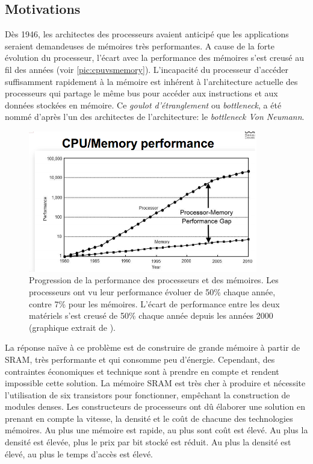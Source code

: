\subsection{Motivations}


Dès 1946, les architectes des processeurs avaient anticipé que les applications seraient demandeuses de mémoires très performantes. A cause de la forte évolution du processeur, l'écart avec la performance des mémoires s'est creusé au fil des années (voir \autoref{pic:cpuvsmemory}). L'incapacité du processeur d'accéder suffisamment rapidement à la mémoire est inhérent à l'architecture actuelle des processeurs qui partage le même bus pour accéder aux instructions et aux données stockées en mémoire. Ce \textit{goulot d'étranglement} ou \textit{bottleneck}, a été nommé d'après l'un des architectes de l'architecture: le \textit{bottleneck Von Neumann}.


\begin{figure}
    \center
    \includegraphics[width=10cm]{images/cpu_vs_memory.png}
    \caption{\label{pic:cpuvsmemory} Progression de la performance des processeurs et des mémoires. Les processeurs ont vu leur performance évoluer de 50\% chaque année, contre 7\% pour les mémoires. L'écart de performance entre les deux matériels s'est creusé de 50\%  chaque année depuis les années 2000 (graphique extrait de \cite{AliSalehi2012}).}
\end{figure}

La réponse naïve à ce problème est de construire de grande mémoire à partir de SRAM, très performante et qui consomme peu d'énergie. Cependant, des contraintes économiques et technique sont à prendre en compte et rendent impossible cette solution. La mémoire SRAM est très cher à produire et nécessite l'utilisation de six transistors pour fonctionner, empêchant la construction de modules denses. Les constructeurs de processeurs ont dû élaborer une solution en prenant en compte la vitesse, la densité et le coût de chacune des technologies mémoires. Au plus une mémoire est rapide, au plus sont coût est élevé. Au plus la densité est élevée, plus le prix par bit stocké est réduit. Au plus la densité est élevé, au plus le temps d'accès est élevé. 






